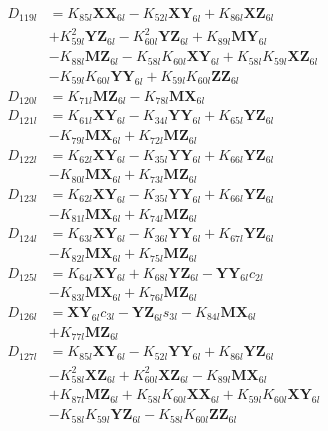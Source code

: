 \begin{multicols}{2}
\begin{align}
D_{119l} &= K_{85l}\mathbf{XX}_{6l} - K_{52l}\mathbf{XY}_{6l} + K_{86l}\mathbf{XZ}_{6l}  \nonumber \\
&+ K_{59l}^2\mathbf{YZ}_{6l} - K_{60l}^2\mathbf{YZ}_{6l} + K_{89l}\mathbf{MY}_{6l}  \nonumber \\
&- K_{88l}\mathbf{MZ}_{6l} - K_{58l}K_{60l}\mathbf{XY}_{6l} + K_{58l}K_{59l}\mathbf{XZ}_{6l}  \nonumber \\
&- K_{59l}K_{60l}\mathbf{YY}_{6l} + K_{59l}K_{60l}\mathbf{ZZ}_{6l} \nonumber \\
D_{120l} &= K_{71l}\mathbf{MZ}_{6l} - K_{78l}\mathbf{MX}_{6l} \nonumber \\
D_{121l} &= K_{61l}\mathbf{XY}_{6l} - K_{34l}\mathbf{YY}_{6l} + K_{65l}\mathbf{YZ}_{6l}  \nonumber \\
&- K_{79l}\mathbf{MX}_{6l} + K_{72l}\mathbf{MZ}_{6l} \nonumber \\
D_{122l} &= K_{62l}\mathbf{XY}_{6l} - K_{35l}\mathbf{YY}_{6l} + K_{66l}\mathbf{YZ}_{6l}  \nonumber \\
&- K_{80l}\mathbf{MX}_{6l} + K_{73l}\mathbf{MZ}_{6l} \nonumber \\
D_{123l} &= K_{62l}\mathbf{XY}_{6l} - K_{35l}\mathbf{YY}_{6l} + K_{66l}\mathbf{YZ}_{6l}  \nonumber \\
&- K_{81l}\mathbf{MX}_{6l} + K_{74l}\mathbf{MZ}_{6l} \nonumber \\
D_{124l} &= K_{63l}\mathbf{XY}_{6l} - K_{36l}\mathbf{YY}_{6l} + K_{67l}\mathbf{YZ}_{6l}  \nonumber \\
&- K_{82l}\mathbf{MX}_{6l} + K_{75l}\mathbf{MZ}_{6l} \nonumber \\
D_{125l} &= K_{64l}\mathbf{XY}_{6l} + K_{68l}\mathbf{YZ}_{6l} - \mathbf{YY}_{6l}c_{2l}  \nonumber \\
&- K_{83l}\mathbf{MX}_{6l} + K_{76l}\mathbf{MZ}_{6l} \nonumber \\
D_{126l} &= \mathbf{XY}_{6l}c_{3l} - \mathbf{YZ}_{6l}s_{3l} - K_{84l}\mathbf{MX}_{6l}  \nonumber \\
&+ K_{77l}\mathbf{MZ}_{6l} \nonumber \\
D_{127l} &= K_{85l}\mathbf{XY}_{6l} - K_{52l}\mathbf{YY}_{6l} + K_{86l}\mathbf{YZ}_{6l}  \nonumber \\
&- K_{58l}^2\mathbf{XZ}_{6l} + K_{60l}^2\mathbf{XZ}_{6l} - K_{89l}\mathbf{MX}_{6l}  \nonumber \\
&+ K_{87l}\mathbf{MZ}_{6l} + K_{58l}K_{60l}\mathbf{XX}_{6l} + K_{59l}K_{60l}\mathbf{XY}_{6l}  \nonumber \\
&- K_{58l}K_{59l}\mathbf{YZ}_{6l} - K_{58l}K_{60l}\mathbf{ZZ}_{6l} \nonumber \\

\end{align}
\end{multicols}
